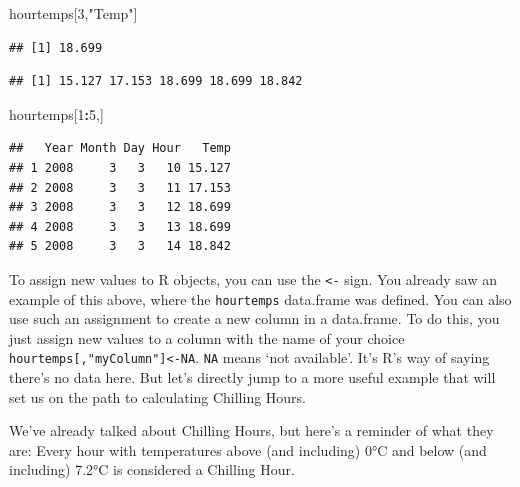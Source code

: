 \documentclass[
]{book}
\newenvironment{Shaded}{\begin{snugshade}}{\end{snugshade}}
\newcommand{\DecValTok}[1]{\textcolor[rgb]{0.00,0.00,0.81}{#1}}
\newcommand{\NormalTok}[1]{#1}
\newcommand{\OperatorTok}[1]{\textcolor[rgb]{0.81,0.36,0.00}{\textbf{#1}}}
\newcommand{\StringTok}[1]{\textcolor[rgb]{0.31,0.60,0.02}{#1}}
\begin{document}
\begin{Shaded}
\begin{Highlighting}[]
\NormalTok{hourtemps[}\DecValTok{3}\NormalTok{,}\StringTok{"Temp"}\NormalTok{]}
\end{Highlighting}
\end{Shaded}

\begin{verbatim}
## [1] 18.699
\end{verbatim}

\begin{Shaded}
\end{Shaded}

\begin{verbatim}
## [1] 15.127 17.153 18.699 18.699 18.842
\end{verbatim}

\begin{Shaded}
\begin{Highlighting}[]
\NormalTok{hourtemps[}\DecValTok{1}\OperatorTok{:}\DecValTok{5}\NormalTok{,]}
\end{Highlighting}
\end{Shaded}

\begin{verbatim}
##   Year Month Day Hour   Temp
## 1 2008     3   3   10 15.127
## 2 2008     3   3   11 17.153
## 3 2008     3   3   12 18.699
## 4 2008     3   3   13 18.699
## 5 2008     3   3   14 18.842
\end{verbatim}

To assign new values to R objects, you can use the \texttt{\textless{}-} sign. You already saw an example of this above, where the \texttt{hourtemps} data.frame was defined. You can also use such an assignment to create a new column in a data.frame. To do this, you just assign new values to a column with the name of your choice \texttt{hourtemps{[},"myColumn"{]}\textless{}-NA}. \texttt{NA} means `not available'. It's R's way of saying there's no data here. But let's directly jump to a more useful example that will set us on the path to calculating Chilling Hours.

We've already talked about Chilling Hours, but here's a reminder of what they are: Every hour with temperatures above (and including) 0°C and below (and including) 7.2°C is considered a Chilling Hour.
\end{document}
